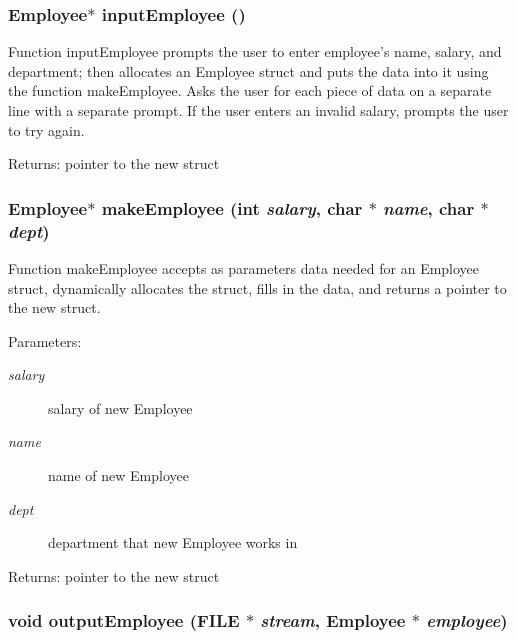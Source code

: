 \subsubsection{\setlength{\rightskip}{0pt plus 5cm}\bf{Employee}$\ast$ input\-Employee ()}\label{mystructs_8c_c2db36c05760bafb3ad1bce84a7a3608}


Function input\-Employee prompts the user to enter employee's name, salary, and department; then allocates an Employee struct and puts the data into it using the function make\-Employee. Asks the user for each piece of data on a separate line with a separate prompt. If the user enters an invalid salary, prompts the user to try again. \begin{Desc}
\item[Returns:]pointer to the new struct \end{Desc}
\subsubsection{\setlength{\rightskip}{0pt plus 5cm}\bf{Employee}$\ast$ make\-Employee (int {\em salary}, char $\ast$ {\em name}, char $\ast$ {\em dept})}\label{mystructs_8c_cf2a4171bc057d7439d14e689a460de9}


Function make\-Employee accepts as parameters data needed for an Employee struct, dynamically allocates the struct, fills in the data, and returns a pointer to the new struct. \begin{Desc}
\item[Parameters:]
\begin{description}
\item[{\em salary}]salary of new Employee \item[{\em name}]name of new Employee \item[{\em dept}]department that new Employee works in \end{description}
\end{Desc}
\begin{Desc}
\item[Returns:]pointer to the new struct \end{Desc}
\subsubsection{\setlength{\rightskip}{0pt plus 5cm}void output\-Employee (FILE $\ast$ {\em stream}, \bf{Employee} $\ast$ {\em employee})}\label{mystructs_8c_fe0dfee3a22cda6855e076582ce67058}


